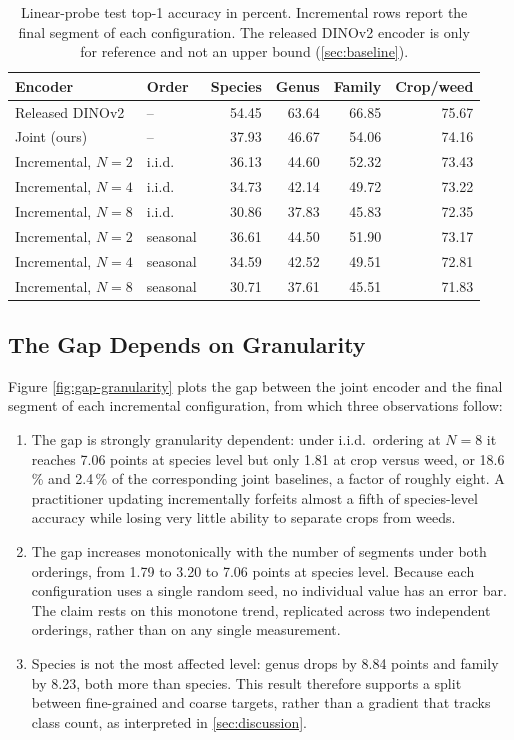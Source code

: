 \documentclass[english]{lni}
\begin{document}
\begin{table}
\centering\footnotesize
\begin{tabular}{llrrrr}
\toprule
Encoder & Order & Species & Genus & Family & Crop/weed \\
\midrule
Released DINOv2               & --      & 54.45 & 63.64 & 66.85 & 75.67 \\
Joint (ours)                  & --      & 37.93 & 46.67 & 54.06 & 74.16 \\
\midrule
Incremental, $N=2$            & i.i.d.  & 36.13 & 44.60 & 52.32 & 73.43 \\
Incremental, $N=4$            & i.i.d.  & 34.73 & 42.14 & 49.72 & 73.22 \\
Incremental, $N=8$            & i.i.d.  & 30.86 & 37.83 & 45.83 & 72.35 \\
\midrule
Incremental, $N=2$            & seasonal & 36.61 & 44.50 & 51.90 & 73.17 \\
Incremental, $N=4$            & seasonal & 34.59 & 42.52 & 49.51 & 72.81 \\
Incremental, $N=8$            & seasonal & 30.71 & 37.61 & 45.51 & 71.83 \\
\bottomrule
\end{tabular}
\caption{Linear-probe test top-1 accuracy in percent. Incremental rows report the final segment of each configuration. The released DINOv2 encoder is only for reference and not an upper bound (\cref{sec:baseline}).}
\label{tab:absolute}
\end{table}

\subsection{The Gap Depends on Granularity}\label{sec:gap}

Figure \ref{fig:gap-granularity} plots the gap between the joint encoder and the final segment of each incremental configuration, from which three observations follow:

\begin{enumerate}
    \item The gap is strongly granularity dependent: under i.i.d.\ ordering at $N=8$ it reaches 7.06 points at species level but only 1.81 at crop versus weed, or 18.6\,\% and 2.4\,\% of the corresponding joint baselines, a factor of roughly eight. A practitioner updating incrementally forfeits almost a fifth of species-level accuracy while losing very little ability to separate crops from weeds.
    \item The gap increases monotonically with the number of segments under both orderings, from 1.79 to 3.20 to 7.06 points at species level. Because each configuration uses a single random seed, no individual value has an error bar. The claim rests on this monotone trend, replicated across two independent orderings, rather than on any single measurement.
    \item Species is not the most affected level: genus drops by 8.84 points and family by 8.23, both more than species. This result therefore supports a split between fine-grained and coarse targets, rather than a gradient that tracks class count, as interpreted in \cref{sec:discussion}.
\end{enumerate}
\end{document}
